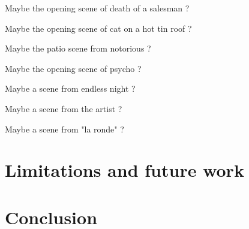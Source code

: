 \documentclass[a4paper,UKenglish]{oasics}
\begin{document}
Maybe the opening scene of death of a salesman  ?

Maybe the opening scene of cat on a hot tin roof ?

Maybe the patio scene from notorious ?

Maybe the opening scene of psycho ? 

Maybe a scene from endless night ? 

Maybe a scene from the artist ?

Maybe a scene from "la ronde" ? 


\section{Limitations and future work}

\section{Conclusion}


%
%


\end{document}
